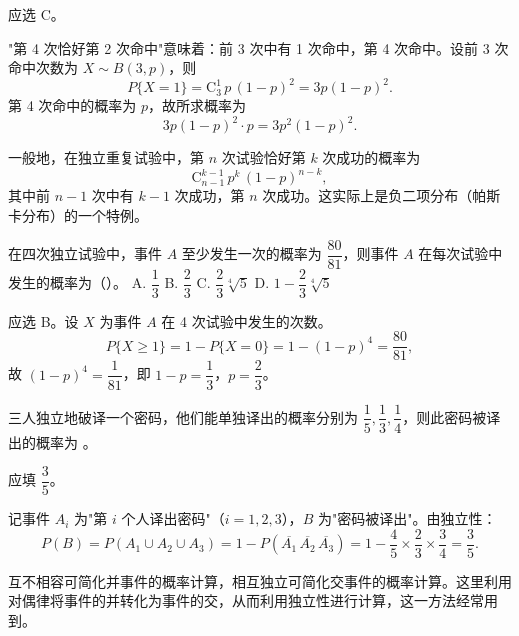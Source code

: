\documentclass[lang=cn,11pt]{elegantbook}
\begin{document}
\begin{solution}
应选 C。

"第 4 次恰好第 2 次命中"意味着：前 3 次中有 1 次命中，第 4 次命中。设前 3 次命中次数为 \(X \sim B(3,p)\)，则
\[
P\{X=1\} = \mathrm{C}_3^1\, p\,(1-p)^2 = 3p(1-p)^2.
\]
第 4 次命中的概率为 \(p\)，故所求概率为
\[
3p(1-p)^2 \cdot p = 3p^2(1-p)^2.
\]
\end{solution}

\begin{note}
一般地，在独立重复试验中，第 \(n\) 次试验恰好第 \(k\) 次成功的概率为
\[
\mathrm{C}_{n-1}^{k-1}\, p^k\, (1-p)^{n-k},
\]
其中前 \(n-1\) 次中有 \(k-1\) 次成功，第 \(n\) 次成功。这实际上是负二项分布（帕斯卡分布）的一个特例。
\end{note}

\begin{exercise}\label{exer:1-25}
在四次独立试验中，事件 \(A\) 至少发生一次的概率为 \(\dfrac{80}{81}\)，则事件 \(A\) 在每次试验中发生的概率为（\quad）。\quad 
A. \(\dfrac{1}{3}\)\quad
B. \(\dfrac{2}{3}\)\quad
C. \(\dfrac{2}{3}\sqrt[4]{5}\)\quad
D. \(1 - \dfrac{2}{3}\sqrt[4]{5}\)
\end{exercise}

\begin{solution}
应选 B。设 \(X\) 为事件 \(A\) 在 4 次试验中发生的次数。
\[P\{X \ge 1\} = 1 - P\{X = 0\} = 1 - (1-p)^4 = \frac{80}{81},\]
故 \((1-p)^4 = \dfrac{1}{81}\)，即 \(1-p = \dfrac{1}{3}\)，\(p = \dfrac{2}{3}\)。
\end{solution}

\begin{exercise}\label{exer:1-44}
三人独立地破译一个密码，他们能单独译出的概率分别为 \(\dfrac{1}{5},\dfrac{1}{3},\dfrac{1}{4}\)，则此密码被译出的概率为 \underline{\hspace{2cm}}。
\end{exercise}

\begin{solution}
应填 \(\dfrac{3}{5}\)。

记事件 \(A_i\) 为"第 \(i\) 个人译出密码"（\(i=1,2,3\)），\(B\) 为"密码被译出"。由独立性：
\[P(B) = P(A_1\cup A_2\cup A_3) = 1-P(\overline{A_1}\,\overline{A_2}\,\overline{A_3}) = 1-\frac{4}{5}\times\frac{2}{3}\times\frac{3}{4} = \frac{3}{5}.\]
\end{solution}

\begin{note}
互不相容可简化并事件的概率计算，相互独立可简化交事件的概率计算。这里利用对偶律将事件的并转化为事件的交，从而利用独立性进行计算，这一方法经常用到。
\end{note}
\end{document}
